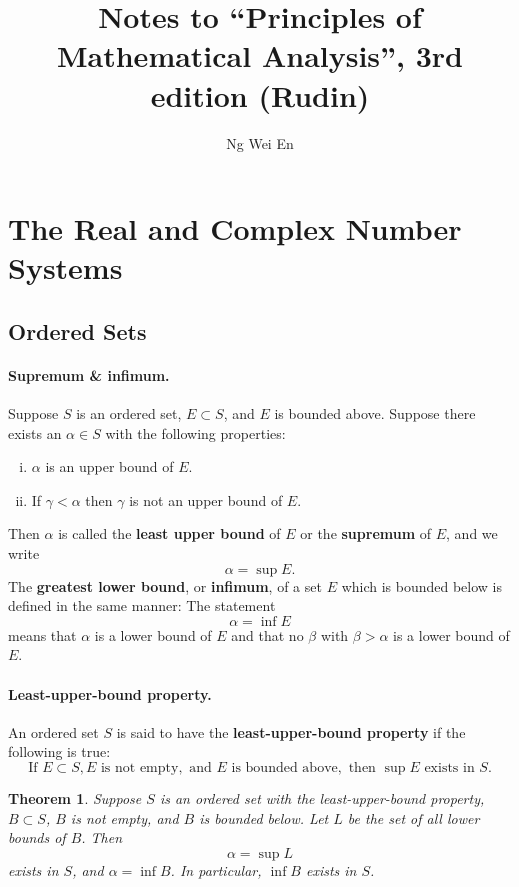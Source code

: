 \documentclass{article}
\title{Notes to ``Principles of Mathematical Analysis'', 3rd edition (Rudin)}
\author{Ng Wei En}
\newtheorem{theorem}{Theorem}
\numberwithin{theorem}{section}
\begin{document}
\maketitle
\tableofcontents
\newpage

\section{The Real and Complex Number Systems}

\subsection*{Ordered Sets}

\paragraph{Supremum \& infimum.} Suppose $S$ is an ordered set, $E \subset S$,
and $E$ is bounded above. Suppose there exists an $\alpha \in S$ with the
following properties:
\begin{enumerate}[(i)]
  \item $\alpha$ is an upper bound of $E$.
  \item If $\gamma < \alpha$ then $\gamma$ is not an upper bound of $E$.
\end{enumerate}
Then $\alpha$ is called the \textbf{least upper bound} of $E$ or the
\textbf{supremum} of $E$, and we write \[
  \alpha = \sup E.
\]
The \textbf{greatest lower bound}, or \textbf{infimum}, of a set $E$ which is
bounded below is defined in the same manner: The statement \[
  \alpha = \inf E
\] means that $\alpha$ is a lower bound of $E$ and that no $\beta$ with $\beta >
\alpha$ is a lower bound of $E$.

\paragraph{Least-upper-bound property.} An ordered set $S$ is said to have the
\textbf{least-upper-bound property} if the following is true: \[
  \text{If } E \subset S, E \text{ is not empty}, \text{ and } E \text{ is
  bounded above}, \text{ then } \sup E \text{ exists in } S.
\]

\setcounter{theorem}{10}
\begin{theorem}
  Suppose $S$ is an ordered set with the least-upper-bound property, $B \subset
  S$, $B$ is not empty, and $B$ is bounded below. Let $L$ be the set of all
  lower bounds of $B$. Then \[
    \alpha = \sup L
  \] exists in $S$, and $\alpha = \inf B$. In particular, $\inf B$ exists in
  $S$.
\end{theorem}
\end{document}
